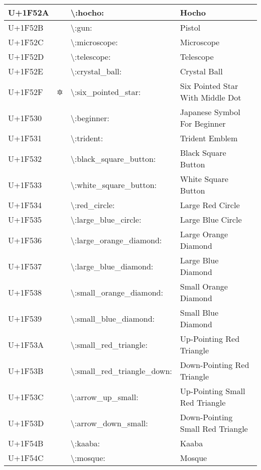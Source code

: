 \begin{table}[h]
\begin{tabulary}{\linewidth}{|L|L|L|L|}
\hline
U+1F52A & 🔪 & {\textbackslash}:hocho: & Hocho \\
\hline
U+1F52B & 🔫 & {\textbackslash}:gun: & Pistol \\
\hline
U+1F52C & 🔬 & {\textbackslash}:microscope: & Microscope \\
\hline
U+1F52D & 🔭 & {\textbackslash}:telescope: & Telescope \\
\hline
U+1F52E & 🔮 & {\textbackslash}:crystal\_ball: & Crystal Ball \\
\hline
U+1F52F & 🔯 & {\textbackslash}:six\_pointed\_star: & Six Pointed Star With Middle Dot \\
\hline
U+1F530 & 🔰 & {\textbackslash}:beginner: & Japanese Symbol For Beginner \\
\hline
U+1F531 & 🔱 & {\textbackslash}:trident: & Trident Emblem \\
\hline
U+1F532 & 🔲 & {\textbackslash}:black\_square\_button: & Black Square Button \\
\hline
U+1F533 & 🔳 & {\textbackslash}:white\_square\_button: & White Square Button \\
\hline
U+1F534 & 🔴 & {\textbackslash}:red\_circle: & Large Red Circle \\
\hline
U+1F535 & 🔵 & {\textbackslash}:large\_blue\_circle: & Large Blue Circle \\
\hline
U+1F536 & 🔶 & {\textbackslash}:large\_orange\_diamond: & Large Orange Diamond \\
\hline
U+1F537 & 🔷 & {\textbackslash}:large\_blue\_diamond: & Large Blue Diamond \\
\hline
U+1F538 & 🔸 & {\textbackslash}:small\_orange\_diamond: & Small Orange Diamond \\
\hline
U+1F539 & 🔹 & {\textbackslash}:small\_blue\_diamond: & Small Blue Diamond \\
\hline
U+1F53A & 🔺 & {\textbackslash}:small\_red\_triangle: & Up-Pointing Red Triangle \\
\hline
U+1F53B & 🔻 & {\textbackslash}:small\_red\_triangle\_down: & Down-Pointing Red Triangle \\
\hline
U+1F53C & 🔼 & {\textbackslash}:arrow\_up\_small: & Up-Pointing Small Red Triangle \\
\hline
U+1F53D & 🔽 & {\textbackslash}:arrow\_down\_small: & Down-Pointing Small Red Triangle \\
\hline
U+1F54B & 🕋 & {\textbackslash}:kaaba: & Kaaba \\
\hline
U+1F54C & 🕌 & {\textbackslash}:mosque: & Mosque \\
\hline

\end{tabulary}
\end{table}
